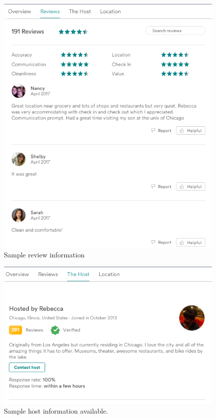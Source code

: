 \begin{figure}[!ht]\centering
\includegraphics[width=.8\textwidth]{figures/sample3-reviews}
\caption{Sample review information}
	\label{fig:reviewinfo}
\end{figure}
\begin{figure}\centering
\includegraphics[width=.9\textwidth]{figures/sample4-host}
\caption[Sample host information]{Sample host information available.}
	\label{fig:host}
\end{figure}
